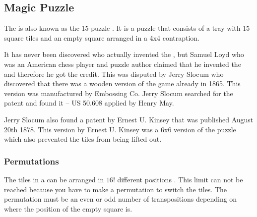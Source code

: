\subsection{Magic Puzzle}
The \mpuzzle{} is also known as the 15-puzzle \cite[pp. 48-50]{Larsen81}. It is a puzzle that consists of a tray with 15 square tiles and an empty square arranged in a 4x4 contraption.

It has never been discovered who actually invented the \mpuzzle{}, but Samuel Loyd who was an American chess player and puzzle author claimed that he invented the \mpuzzle{} and therefore he got the credit. %
This was disputed by Jerry Slocum who discovered that there was a wooden version of the game already in 1865. This version was manufactured by Embossing Co. Jerry Slocum searched for the patent and found it -- US 50.608 applied by Henry May.

Jerry Slocum also found a patent by Ernest U. Kinsey that was published August 20th 1878. This version by Ernest U. Kinsey was a 6x6 version of the puzzle which also prevented the tiles from being lifted out.

\subsubsection {Permutations}
The tiles in a \mpuzzle{} can be arranged in $16!$ different positions \cite{jaapsch}. This limit can not be reached because you have to make a permutation to switch the tiles. The permutation must be an even or odd number of transpositions depending on where the position of the empty square is.

